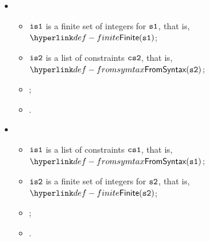 \begin{itemize}
  \item {}
  \begin{itemize}
    \item $\visone$ is a finite set of integers for $\vsone$, that is, $\Finite(\vsone)$;
    \item $\vistwo$ is a list of constraints $\cstwo$, that is, $\FromSyntax(\vstwo)$;
    \item \ProseapproxconstraintsUnder{$\tenv$}{$\cstwo$}{$\vstwo$};
    \item {}.
  \end{itemize}

  \item {}
  \begin{itemize}
    \item $\visone$ is a list of constraints $\csone$, that is, $\FromSyntax(\vsone)$;
    \item $\vistwo$ is a finite set of integers for $\vstwo$, that is, $\Finite(\vstwo)$;
    \item \ProseapproxconstraintsOver{$\tenv$}{$\csone$}{$\vsone$};
    \item {}.
  \end{itemize}
\end{itemize}

\FormallyParagraph
\begin{mathpar}
\end{mathpar}

\begin{mathpar}
\end{mathpar}

\begin{mathpar}
\end{mathpar}

